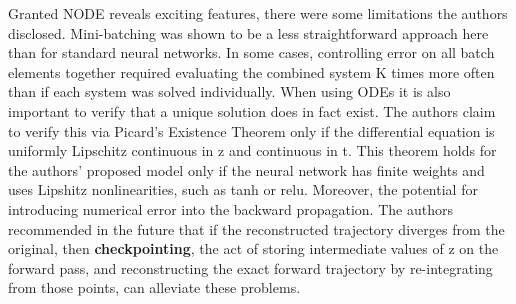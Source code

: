 \documentclass{article}
\begin{document}
Granted NODE reveals exciting features, there were some limitations the authors disclosed. Mini-batching was shown to be a less straightforward approach here than for standard neural networks. In some cases, controlling error on all batch elements together required evaluating the combined system K times more often than if each system was solved individually.  When using ODEs it is also important to verify that a unique solution does in fact exist. The authors claim to verify this via Picard's Existence Theorem \cite{coddington1955theory}  only if the differential equation is uniformly Lipschitz continuous in z and continuous in t. This theorem holds for the authors' proposed model only if the neural network has finite weights and uses Lipshitz nonlinearities, such as tanh or relu.
Moreover, the potential for introducing numerical error into the backward propagation. The authors recommended in the future that if the reconstructed trajectory diverges from the original, then \textbf{checkpointing}, the act of storing intermediate values of z on the forward pass, and reconstructing the exact forward trajectory by re-integrating from those points, can alleviate these problems.


\nocite{langley00}



\end{document}
